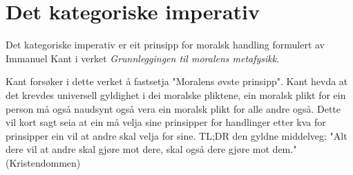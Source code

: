 \documentclass[a4paper]{IEEEtran}
\begin{document}
\section{Det kategoriske imperativ}
\label{detkategoriskeimperativ}\bigskip

Det kategoriske imperativ er eit prinsipp for moralsk handling formulert av Immanuel Kant i verket \textit{Grunnleggingen til moralens metafysikk}.\bigskip

Kant forsøker i dette verket å fastsetja "Moralens øvste prinsipp". Kant hevda at det krevdes universell gyldighet i dei moralske pliktene, ein moralsk plikt for ein person må også naudsynt også vera ein moralsk plikt for alle andre også. Dette vil kort sagt seia at ein må velja sine prinsipper for handlinger etter kva for prinsipper ein vil at andre skal velja for sine. TL;DR den gyldne middelveg: "Alt dere vil at andre skal gjøre mot dere, skal også dere gjøre mot dem." (Kristendommen)


\end{document}
